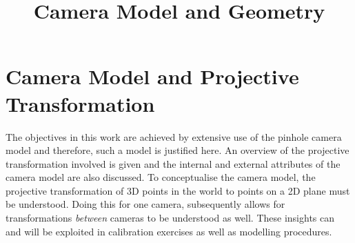\documentclass[12pt]{article}
\begin{document}
\title{Camera Model and Geometry}

\section{Camera Model and Projective Transformation}
The objectives in this work are achieved by extensive use of the pinhole camera model and therefore, such a model is justified here. An overview of the projective transformation involved is given and the internal and external attributes of the camera model are also discussed. To conceptualise the camera model, the projective transformation of 3D points in the world to points on a 2D plane must be understood. Doing this for one camera, subsequently allows for transformations \textit{between} cameras to be understood as well. These insights can and will be exploited in calibration exercises as well as modelling procedures.
\end{document}
